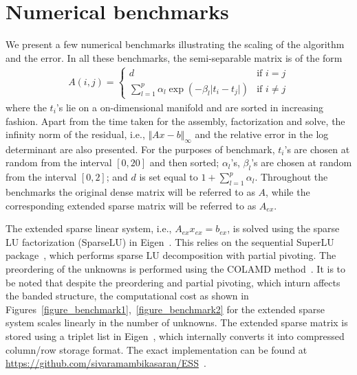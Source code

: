\documentclass[times]{nlaauth}
\begin{document}

\section{Numerical benchmarks}
\label{section_nb}
We present a few numerical benchmarks illustrating the scaling of the algorithm and the error. In all these benchmarks, the semi-separable matrix is of the form
\begin{align}
A(i,j) =
\begin{cases}
d & \text{if }i=j\\
\displaystyle \sum_{l=1}^p \alpha_l \exp\left(-\beta_l \lvert t_i-t_j\rvert\right) & \text{if }i \neq j
\end{cases}
\end{align}
where the $t_i$'s lie on a on-dimensional manifold and are sorted in increasing fashion. Apart from the time taken for the assembly, factorization and solve, the infinity norm of the residual, i.e., $\Vert Ax-b \Vert_{\infty}$ and the relative error in the log determinant are also presented. For the purposes of benchmark, $t_i$'s are chosen at random from the interval $[0,20]$ and then sorted; $\alpha_l$'s, $\beta_l$'s are chosen at random from the interval $[0,2]$; and $d$ is set equal to $1+\displaystyle \sum_{l=1}^p \alpha_l$. Throughout the benchmarks the original dense matrix will be referred to as $A$, while the corresponding extended sparse matrix will be referred to as $A_{ex}$.

The extended sparse linear system, i.e., $A_{ex}x_{ex} = b_{ex}$, is solved using the sparse LU factorization (SparseLU) in Eigen~\cite{eigenweb}. This relies on the sequential SuperLU package~\cite{demmel1999supernodal, demmel2011superlu, li2005overview}, which performs sparse LU decomposition with partial pivoting. The preordering of the unknowns is performed using the COLAMD method~\cite{davis2004algorithm}. It is to be noted that despite the preordering and partial pivoting, which inturn affects the banded structure, the computational cost as shown in Figures~\ref{figure_benchmark1},~\ref{figure_benchmark2} for the extended sparse system scales linearly in the number of unknowns. The extended sparse matrix is stored using a triplet list in Eigen~\cite{eigenweb}, which internally converts it into compressed column/row storage format. The exact implementation can be found at \url{https://github.com/sivaramambikasaran/ESS}~\cite{ambikasaran2014ESS}.
\end{document}
